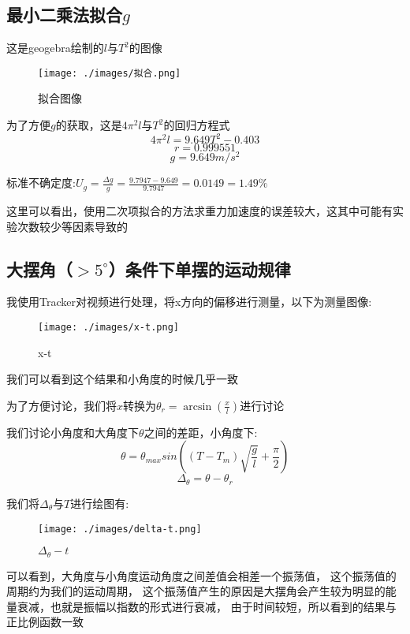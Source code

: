 \documentclass{article}
\begin{document}
    \subsection{最小二乘法拟合$g$}
        这是geogebra绘制的$l$与$T^{2}$的图像

        \begin{figure}[!hbtp]
            \centering
            \texttt{[image: ./images/拟合.png]}
            \caption{拟合图像}
        \end{figure} 

        为了方便$g$的获取，这是$4\pi ^{2}l$与$T^{2}$的回归方程式
        \[4\pi ^{2}l=9.649T^{2}-0.403\]
        \[r=0.999551\]
        \[g=9.649m/s^{2}\]
        
        标准不确定度:$U_{g}=\frac{\Delta g}{g}=\frac{9.7947-9.649}{9.7947}=0.0149=1.49\%$
        
        这里可以看出，使用二次项拟合的方法求重力加速度的误差较大，这其中可能有实验次数较少等因素导致的
    
    \subsection{大摆角（$>5^{\circ }$）条件下单摆的运动规律}
        我使用Tracker对视频进行处理，将x方向的偏移进行测量，以下为测量图像:

        \begin{figure}[!hbtp]
            \centering
            \texttt{[image: ./images/x-t.png]}
            \caption{x-t}
        \end{figure}

        我们可以看到这个结果和小角度的时候几乎一致

        为了方便讨论，我们将$x$转换为$\theta_{r}=\arcsin(\frac{x}{l})$进行讨论

        我们讨论小角度和大角度下$\theta$之间的差距，小角度下:
        \[\theta=\theta_{max}sin((T-T_{m})\sqrt{\frac{g}{l}}+\frac{\pi}{2})\]
        \[\Delta_{\theta}=\theta-\theta_{r}\]

        我们将$\Delta_{\theta}$与$T$进行绘图有:

        \begin{figure}[!hbtp]
            \centering
            \texttt{[image: ./images/delta-t.png]}
            \caption{$\Delta_{\theta}-t$}
        \end{figure}


        可以看到，大角度与小角度运动角度之间差值会相差一个振荡值，
        这个振荡值的周期约为我们的运动周期，
        这个振荡值产生的原因是大摆角会产生较为明显的能量衰减，也就是振幅以指数的形式进行衰减，
        由于时间较短，所以看到的结果与正比例函数一致
        
\end{document}
